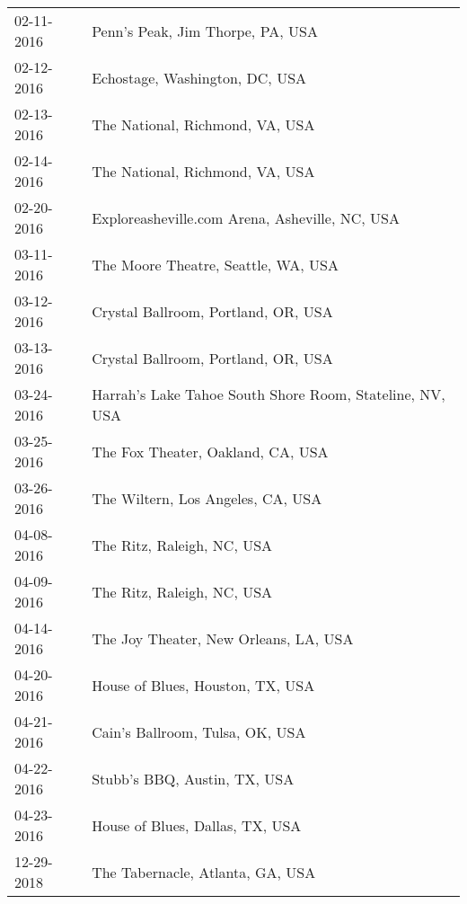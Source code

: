 \begin{supertabular}{ll}
 02-11-2016 &                          Penn's Peak, Jim Thorpe, PA, USA \\
 02-12-2016 &                            Echostage, Washington, DC, USA \\
 02-13-2016 &                           The National, Richmond, VA, USA \\
 02-14-2016 &                           The National, Richmond, VA, USA \\
 02-20-2016 &            Exploreasheville.com Arena, Asheville, NC, USA \\
 03-11-2016 &                       The Moore Theatre, Seattle, WA, USA \\
 03-12-2016 &                       Crystal Ballroom, Portland, OR, USA \\
 03-13-2016 &                       Crystal Ballroom, Portland, OR, USA \\
 03-24-2016 &  Harrah’s Lake Tahoe South Shore Room, Stateline, NV, USA \\
 03-25-2016 &                         The Fox Theater, Oakland, CA, USA \\
 03-26-2016 &                         The Wiltern, Los Angeles, CA, USA \\
 04-08-2016 &                                The Ritz, Raleigh, NC, USA \\
 04-09-2016 &                                The Ritz, Raleigh, NC, USA \\
 04-14-2016 &                    The Joy  Theater, New Orleans, LA, USA \\
 04-20-2016 &                          House of Blues, Houston, TX, USA \\
 04-21-2016 &                           Cain's Ballroom, Tulsa, OK, USA \\
 04-22-2016 &                              Stubb's BBQ, Austin, TX, USA \\
 04-23-2016 &                           House of Blues, Dallas, TX, USA \\
 12-29-2018 &                          The Tabernacle, Atlanta, GA, USA \\
\end{supertabular}
